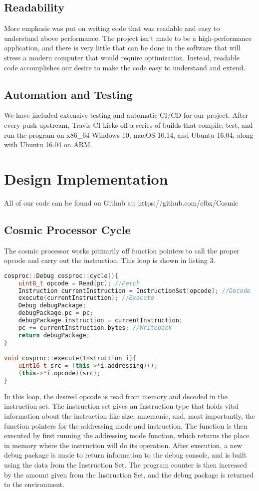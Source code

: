 \documentclass[conference]{IEEEtran}
\begin{document}
\subsection{Readability}
More emphasis was put on writing code that was readable and easy to understand above performance. The project isn't made to be a high-performance application, and there is very little that can be done in the software that will stress a modern computer that would require optimization. Instead, readable code accomplishes our desire to make the code easy to understand and extend.


\subsection{Automation and Testing}

We have included extensive testing and automatic CI/CD for our project. After every push upstream, Travis CI kicks off a series of builds that compile, test, and run the program on x86\_64 Windows 10, macOS 10.14, and Ubuntu 16.04, along with Ubuntu 16.04 on ARM.


\section{Design Implementation}
All of our code can be found on Github at: https://github.com/clbx/Cosmic
\subsection{Cosmic Processor Cycle}
The cosmic processor works primarily off function pointers to call the proper opcode and carry out the instruction. This loop is shown in listing 3.

\begin{lstlisting}[language=C++, caption=Instruction Execution Loop]
cosproc::Debug cosproc::cycle(){
	uint8_t opcode = Read(pc); //Fetch
	Instruction currentInstruction = InstructionSet[opcode]; //Decode
	execute(currentInstruction); //Execute
	Debug debugPackage;
	debugPackage.pc = pc;
	debugPackage.instruction = currentInstruction;
	pc += currentInstruction.bytes; //Writeback
	return debugPackage;
}

void cosproc::execute(Instruction i){
	uint16_t src = (this->*i.addressing)();
	(this->*i.opcode)(src);
}
\end{lstlisting}
In this loop, the desired opcode is read from memory and decoded in the instruction set. The instruction set gives an Instruction type that holds vital information about the instruction like size, mnemonic, and, most importantly, the function pointers for the addressing mode and instruction. The function is then executed by first running the addressing mode function, which returns the place in memory where the instruction will do its operation. After execution, a new debug package is made to return information to the debug console, and is built using the data from the Instruction Set. The program counter is then increased by the amount given from the Instruction Set, and the debug package is returned to the environment.
\end{document}

